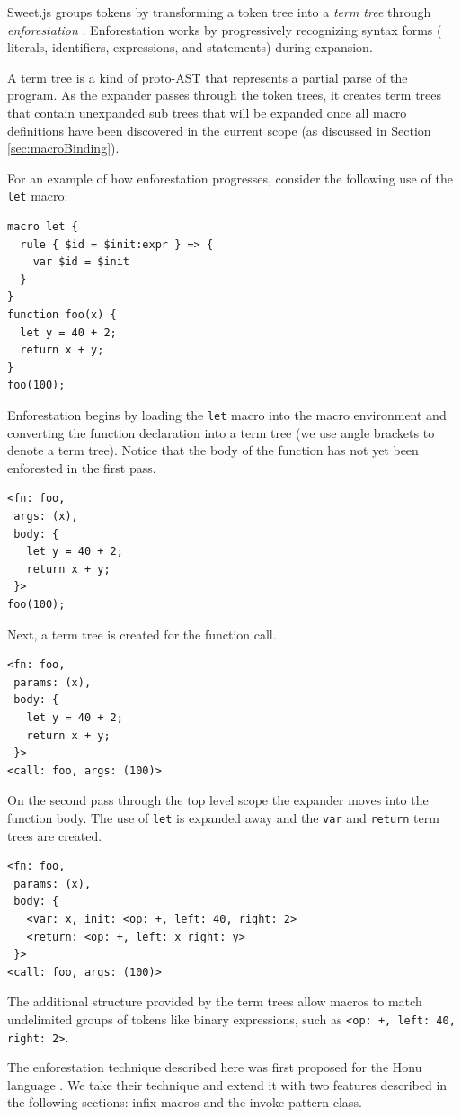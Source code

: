 \documentclass[preprint,10pt]{sigplanconf}
\begin{document}
Sweet.js groups tokens by
transforming a token tree into a
\emph{term tree} through \emph{enforestation} \cite{Rafkind2013}.
Enforestation works by progressively recognizing syntax forms (\eg
literals, identifiers, expressions, and statements) during expansion.

A term tree is a kind of proto-AST that represents a partial parse of
the program. As the expander passes through the token trees, it
creates term trees that contain unexpanded sub trees that will be
expanded once all macro definitions have been discovered in the
current scope (as discussed in Section \ref{sec:macroBinding}).

For an example of how enforestation progresses, consider the following
use of the \verb!let! macro:
\begin{lstlisting}
macro let {
  rule { $id = $init:expr } => {
    var $id = $init
  }
}
function foo(x) {
  let y = 40 + 2;
  return x + y;
}
foo(100);
\end{lstlisting}
Enforestation begins by loading the \verb!let! macro into the
macro environment and converting the function declaration into a term
tree (we use angle brackets to denote a term tree). Notice that the
body of the function has not yet been enforested in the first pass.
\begin{lstlisting}
<fn: foo, 
 args: (x), 
 body: {
   let y = 40 + 2;
   return x + y;
 }>
foo(100);
\end{lstlisting}
Next, a term tree is created for the function call.
\begin{lstlisting}
<fn: foo, 
 params: (x), 
 body: {
   let y = 40 + 2;
   return x + y;
 }>
<call: foo, args: (100)>
\end{lstlisting}
On the second pass through the top level scope the expander moves into
the function body. The use of \verb!let! is expanded away and the
\verb!var! and \verb!return! term trees are created.
\begin{lstlisting}
<fn: foo, 
 params: (x), 
 body: {
   <var: x, init: <op: +, left: 40, right: 2>
   <return: <op: +, left: x right: y> 
 }>
<call: foo, args: (100)>
\end{lstlisting}

The additional structure provided by the term trees allow macros to
match undelimited groups of tokens like binary expressions, such as
\verb!<op: +, left: 40, right: 2>!.

The enforestation technique described here was first proposed for the
Honu language \cite{Rafkind2013}. We take their technique and extend
it with two features described in the following sections:
infix macros and the invoke pattern class.
\end{document}
